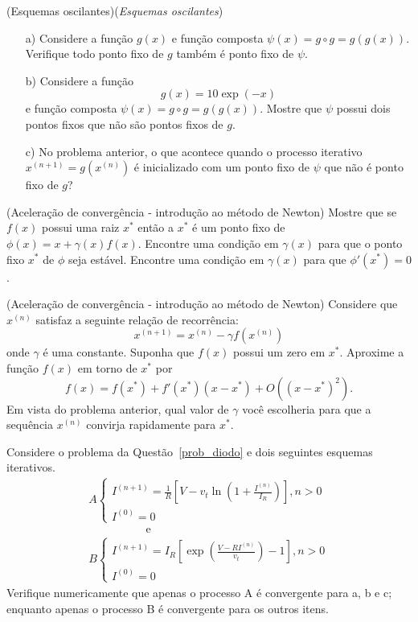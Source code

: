 \begin{exer}(Esquemas oscilantes)(\textit{Esquemas oscilantes})
\begin{itemize}
\item[a)] Considere a função $g(x)$ e função composta $\psi(x)=g\circ g=g\left(g(x)\right)$. Verifique todo ponto fixo de $g$ também é ponto fixo de $\psi$.

\item[b)]  Considere a função $$g(x)=10\exp(-x)$$ e função composta $\psi(x)=g\circ g=g\left(g(x)\right)$. Mostre que $\psi$ possui dois pontos fixos que não são pontos fixos de $g$.

\item[c)]  No problema anterior, o que acontece quando o processo iterativo $x^{(n+1)}=g(x^{(n)})$ é inicializado com um ponto fixo de $\psi$ que não é ponto fixo de $g$?
\end{itemize}
\end{exer}

\begin{exer}(Aceleração de convergência - introdução ao método de Newton)\label{int_new1} Mostre que se $f(x)$ possui uma raiz $x^*$ então a $x^*$ é um ponto fixo de $\phi(x)=x+\gamma(x) f(x)$. Encontre uma condição em $\gamma(x)$ para que o ponto fixo $x^*$ de $\phi$ seja estável. Encontre uma condição em $\gamma(x)$ para que $\phi'(x^*)=0$.
\end{exer}

\begin{exer}(Aceleração de convergência - introdução ao método de Newton)\label{int_new2} Considere que $x^{(n)}$ satisfaz a seguinte relação de recorrência:
$$x^{(n+1)}=x^{(n)} - \gamma f(x^{(n)})$$
onde $\gamma$ é uma constante. Suponha que $f(x)$ possui um zero em $x^*$. Aproxime a função $f(x)$ em torno de $x^*$ por
$$f(x)=f(x^*)+f'(x^*)(x-x^*)+O\left((x-x^*)^2\right).$$
Em vista do problema anterior, qual valor de $\gamma$ você escolheria para que a sequência $x^{(n)}$ convirja rapidamente para $x^*$. 
\end{exer}

\begin{exer} Considere o problema da Questão~\ref{prob_diodo} e dois seguintes esquemas iterativos.
$$\begin{array}{l}
A\left\{
\begin{array}{ll}
I^{(n+1)}=\frac{1}{R}\left[V-v_t\ln\left(1+\frac{I^{(n)}}{I_R}\right)\right],n>0\\
I^{(0)}=0
\end{array}\right.\\ \hspace{2cm} \text{ e }\\
B\left\{
\begin{array}{ll}
I^{(n+1)}=I_R\left[\exp\left(\frac{V-RI^{(n)}}{v_t}\right)-1\right],n>0\\
I^{(0)}=0
\end{array}\right.
\end{array}
$$
Verifique numericamente que apenas o processo A é convergente para a, b e c; enquanto apenas o processo B é convergente para os outros itens.
\end{exer}

